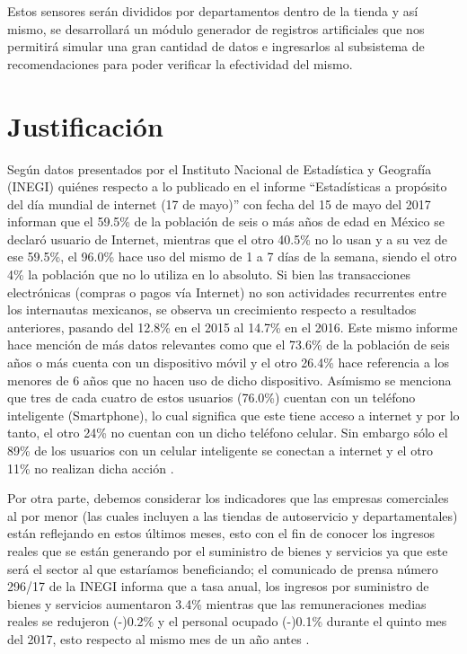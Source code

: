 Estos sensores serán divididos por departamentos dentro de la tienda y así mismo, se desarrollará un módulo generador de registros artificiales que nos permitirá simular una gran cantidad de datos e ingresarlos al subsistema de recomendaciones para poder verificar la efectividad del mismo.

\section{Justificación}
Según datos presentados por el Instituto Nacional de Estadística y Geografía (INEGI) quiénes respecto a lo publicado en el informe “Estadísticas a propósito del día mundial de internet (17 de mayo)” con fecha del 15 de mayo del 2017 informan que el 59.5\% de la población de seis o más años de edad en México se declaró usuario de Internet, mientras que el otro 40.5\% no lo usan y a su vez de ese 59.5\%, el 96.0\% hace uso del mismo de 1 a 7 días de la semana, siendo el otro 4\% la población que no lo utiliza en lo absoluto. Si bien las transacciones electrónicas (compras o pagos vía Internet) no son actividades recurrentes entre los internautas mexicanos, se observa un crecimiento respecto a resultados anteriores, pasando del 12.8\% en el 2015 al 14.7\% en el 2016. Este mismo informe hace mención de más datos relevantes como que el 73.6\% de la población de seis años o más cuenta con un dispositivo móvil y el otro 26.4\% hace referencia a los menores de 6 años que no hacen uso de dicho dispositivo. Asímismo se menciona que tres de cada cuatro de estos usuarios (76.0\%) cuentan con un teléfono inteligente (Smartphone), lo cual significa que este tiene acceso a internet y por lo tanto, el otro 24\% no cuentan con un dicho teléfono celular. Sin embargo sólo el 89\% de los usuarios con un celular inteligente se conectan a internet y el otro 11\% no realizan dicha acción \cite{estadistica}.
\\ \par
Por otra parte, debemos considerar los indicadores que las empresas comerciales al por menor (las cuales incluyen a las tiendas de autoservicio y departamentales) están reflejando en estos últimos meses, esto con el fin de conocer los ingresos reales que se están generando por el suministro de bienes y servicios ya que este será el sector al que estaríamos beneficiando; el comunicado de prensa número 296/17 de la INEGI informa que a tasa anual, los ingresos por suministro de bienes y servicios aumentaron 3.4\% mientras que las remuneraciones medias reales se redujeron (-)0.2\% y el personal ocupado (-)0.1\% durante el quinto mes del 2017, esto respecto al mismo mes de un año antes  \cite{comunicado}.
\\ \par

